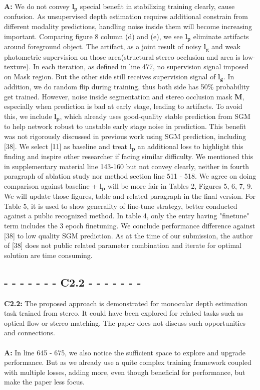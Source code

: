 \documentclass[10pt,twocolumn,letterpaper]{article}
\begin{document}
\noindent\textbf{A:} We do not convey $\mathbf{l_p}$ special benefit in stabilizing training clearly, cause confusion. As unsupervised depth estimation requires additional constrain from different modality predictions, handling noise inside them will become increasing important. Comparing figure 8 column (d) and (e), we see $\mathbf{l_p}$ eliminate artifacts around foreground object. The artifact, as a joint result of noisy $\mathbf{l_g}$ and weak photometric supervision on those area(structural stereo occlusion and area is low-texture). In each iteration, as defined in line 477, no supervision signal imposed on Mask region. But the other side still receives supervision signal of $\mathbf{l_g}$. In addition, we do random flip during training, thus both side has 50\% probability get trained. However, noise inside segmentation and stereo occlusion mask $\mathbf{M}$, especially when prediction is bad at early stage, leading to artifacts. To avoid this, we include $\mathbf{l_p}$, which already uses good-quality stable prediction from SGM to help network robust to unstable early stage noise in prediction. This benefit was not rigorously discussed in previous work using SGM prediction, including [38]. We select [11] as baseline and treat $\mathbf{l_p}$ an additional loss to highlight this finding and inspire other researcher if facing similar difficulty. We mentioned this in supplementary material line 143-160 but not convey clearly, neither in fourth paragraph of ablation study nor method section line 511 - 518. We agree on doing comparison against baseline + $\mathbf{l_p}$ will be more fair in Tables 2, Figures 5, 6, 7, 9. We will update those figures, table and related paragraph in the final version. For Table 5, it is used to show generality of fine-tune strategy, better conducted against a public recognized method. In table 4, only the entry having "finetune" term includes the 3 epoch finetuning. We conclude performance difference against [38] to low quality SGM prediction. As at the time of our submission, the author of [38] does not public related parameter combination and iterate for optimal solution are time consuming.
\subsection*{- - - - - - - C2.2 - - - - - - -}
\noindent\textbf{C2.2:} The proposed approach is demonstrated for monocular depth estimation task trained from stereo. It could have been explored for related tasks such as optical flow or stereo matching. The paper does not discuss such opportunities and connections. \\ \\
\noindent\textbf{A:} In line 645 - 675, we also notice the sufficient space to explore and upgrade performance. But as we already use a quite complex training framework coupled with multiple losses, adding more, even though beneficial for performance, but make the paper less focus.
\end{document}
